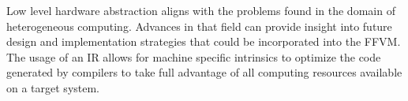 Low level hardware abstraction aligns with the problems found in the domain of heterogeneous computing. Advances in that field can provide insight into future design and implementation strategies that could be incorporated into the FFVM. The usage of an IR allows for machine specific intrinsics to optimize the code generated by compilers to take full advantage of all computing resources available on a target system.


